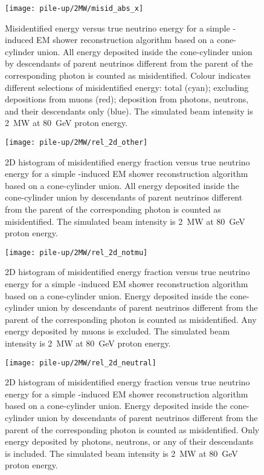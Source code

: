 \begin{figure}[htb]
	\centering
	\texttt{[image: pile-up/2MW/misid\_abs\_x]}
	\caption{Misidentified energy versus true neutrino energy for a simple \Pgpz-induced EM shower reconstruction algorithm based on a cone-cylinder union.
		All energy deposited inside the cone-cylinder union by descendants of parent neutrinos different from the parent of the corresponding \Pgpz photon is counted as misidentified.
		Colour indicates different selections of misidentified energy: total (cyan); excluding depositions from muons (red); deposition from photons, neutrons, and their descendants only (blue).
		The simulated beam intensity is \SI{2}{\mega\watt} at \SI{80}{\giga\electronvolt} proton energy.}
\end{figure}

\begin{figure}[htb]
	\centering
	\texttt{[image: pile-up/2MW/rel\_2d\_other]}
	\caption{2D histogram of misidentified energy fraction versus true neutrino energy for a simple \Pgpz-induced EM shower reconstruction algorithm based on a cone-cylinder union.
		All energy deposited inside the cone-cylinder union by descendants of parent neutrinos different from the parent of the corresponding \Pgpz photon is counted as misidentified.
		The simulated beam intensity is \SI{2}{\mega\watt} at \SI{80}{\giga\electronvolt} proton energy.}
\end{figure}

\begin{figure}[htb]
	\centering
	\texttt{[image: pile-up/2MW/rel\_2d\_notmu]}
	\caption{2D histogram of misidentified energy fraction versus true neutrino energy for a simple \Pgpz-induced EM shower reconstruction algorithm based on a cone-cylinder union.
		Energy deposited inside the cone-cylinder union by descendants of parent neutrinos different from the parent of the corresponding \Pgpz photon is counted as misidentified.
		Any energy deposited by muons is excluded.
		The simulated beam intensity is \SI{2}{\mega\watt} at \SI{80}{\giga\electronvolt} proton energy.}
\end{figure}

\begin{figure}[htb]
	\centering
	\texttt{[image: pile-up/2MW/rel\_2d\_neutral]}
	\caption{2D histogram of misidentified energy fraction versus true neutrino energy for a simple \Pgpz-induced EM shower reconstruction algorithm based on a cone-cylinder union.
		Energy deposited inside the cone-cylinder union by descendants of parent neutrinos different from the parent of the corresponding \Pgpz photon is counted as misidentified.
		Only energy deposited by photons, neutrons, or any of their descendants is included.
		The simulated beam intensity is \SI{2}{\mega\watt} at \SI{80}{\giga\electronvolt} proton energy.}
\end{figure}

